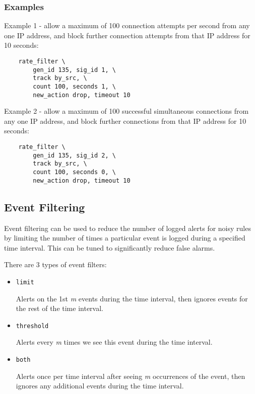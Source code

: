\documentclass[english]{report}
\begin{document}
\subsubsection{Examples}

Example 1 - allow a maximum of 100 connection attempts per second from any one
IP address, and block further connection attempts from that IP address for 10
seconds:

\begin{verbatim}
    rate_filter \
        gen_id 135, sig_id 1, \
        track by_src, \
        count 100, seconds 1, \
        new_action drop, timeout 10
\end{verbatim}

Example 2 - allow a maximum of 100 successful simultaneous connections from any
one IP address, and block further connections from that IP address for 10
seconds:

\begin{verbatim}
    rate_filter \
        gen_id 135, sig_id 2, \
        track by_src, \
        count 100, seconds 0, \
        new_action drop, timeout 10
\end{verbatim}

\subsection{Event Filtering}
\label{event_filtering}

Event filtering can be used to reduce the number of logged alerts for noisy
rules by limiting the number of times a particular event is logged during a
specified time interval.  This can be tuned to significantly reduce false
alarms.

There are 3 types of event filters:

\begin{itemize} 
\item \texttt{limit} 

Alerts on the 1st \textit{m} events during the time interval, then ignores
events for the rest of the time interval.

\item \texttt{threshold} 

Alerts every \textit{m} times we see this event during the time interval.

\item \texttt{both} 

Alerts once per time interval after seeing \textit{m} occurrences of the event,
then ignores any additional events during the time interval.

\end{itemize}
\end{document}
